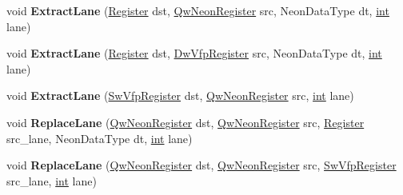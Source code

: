 \begin{DoxyCompactItemize}
\item 
\mbox{\label{classv8_1_1internal_1_1TurboAssembler_ac38e16c2ef9e9cfd84dbb0ba237e2d9f}} 
void {\bfseries Extract\+Lane} (\mbox{\hyperlink{classv8_1_1internal_1_1Register}{Register}} dst, \mbox{\hyperlink{classv8_1_1internal_1_1QwNeonRegister}{Qw\+Neon\+Register}} src, Neon\+Data\+Type dt, \mbox{\hyperlink{classint}{int}} lane)
\item 
\mbox{\label{classv8_1_1internal_1_1TurboAssembler_aa9434ee85be7a699d2e44d8a5a32bee3}} 
void {\bfseries Extract\+Lane} (\mbox{\hyperlink{classv8_1_1internal_1_1Register}{Register}} dst, \mbox{\hyperlink{classv8_1_1internal_1_1DwVfpRegister}{Dw\+Vfp\+Register}} src, Neon\+Data\+Type dt, \mbox{\hyperlink{classint}{int}} lane)
\item 
\mbox{\label{classv8_1_1internal_1_1TurboAssembler_ad87d48d5814cf96db8d3b5f80df45ee1}} 
void {\bfseries Extract\+Lane} (\mbox{\hyperlink{classv8_1_1internal_1_1SwVfpRegister}{Sw\+Vfp\+Register}} dst, \mbox{\hyperlink{classv8_1_1internal_1_1QwNeonRegister}{Qw\+Neon\+Register}} src, \mbox{\hyperlink{classint}{int}} lane)
\item 
\mbox{\label{classv8_1_1internal_1_1TurboAssembler_ac6caa3e45ccb1cdaa93732a071308152}} 
void {\bfseries Replace\+Lane} (\mbox{\hyperlink{classv8_1_1internal_1_1QwNeonRegister}{Qw\+Neon\+Register}} dst, \mbox{\hyperlink{classv8_1_1internal_1_1QwNeonRegister}{Qw\+Neon\+Register}} src, \mbox{\hyperlink{classv8_1_1internal_1_1Register}{Register}} src\+\_\+lane, Neon\+Data\+Type dt, \mbox{\hyperlink{classint}{int}} lane)
\item 
\mbox{\label{classv8_1_1internal_1_1TurboAssembler_a1c532cfd9d13ca7e8842344125d5772f}} 
void {\bfseries Replace\+Lane} (\mbox{\hyperlink{classv8_1_1internal_1_1QwNeonRegister}{Qw\+Neon\+Register}} dst, \mbox{\hyperlink{classv8_1_1internal_1_1QwNeonRegister}{Qw\+Neon\+Register}} src, \mbox{\hyperlink{classv8_1_1internal_1_1SwVfpRegister}{Sw\+Vfp\+Register}} src\+\_\+lane, \mbox{\hyperlink{classint}{int}} lane)
\item 
\mbox{\label{classv8_1_1internal_1_1TurboAssembler_a508453781521a463ec14cd67cc5c0579}} 

\end{DoxyCompactItemize}
